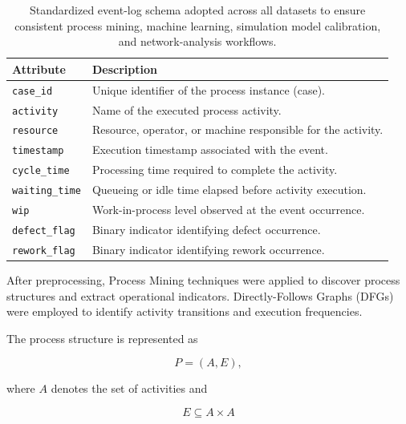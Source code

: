 \documentclass[pdflatex,iicol,Numbered,sn-basic]{sn-jnl}
\begin{document}
\begin{table}[t]
\caption{
Standardized event-log schema adopted across all datasets to ensure consistent process mining, machine learning, simulation model calibration, and network-analysis workflows.
}
\label{tab:event_schema}
\centering
\begin{tabularx}{\linewidth}{p{3cm}X}
\toprule
\textbf{Attribute} & \textbf{Description} \\
\midrule

\texttt{case\_id}
&
Unique identifier of the process instance (case).
\\

\texttt{activity}
&
Name of the executed process activity.
\\

\texttt{resource}
&
Resource, operator, or machine responsible for the activity.
\\

\texttt{timestamp}
&
Execution timestamp associated with the event.
\\

\texttt{cycle\_time}
&
Processing time required to complete the activity.
\\

\texttt{waiting\_time}
&
Queueing or idle time elapsed before activity execution.
\\

\texttt{wip}
&
Work-in-process level observed at the event occurrence.
\\

\texttt{defect\_flag}
&
Binary indicator identifying defect occurrence.
\\

\texttt{rework\_flag}
&
Binary indicator identifying rework occurrence.
\\

\bottomrule
\end{tabularx}
\end{table}

After preprocessing, Process Mining techniques were applied to discover process structures and extract operational indicators. Directly-Follows Graphs (DFGs) were employed to identify activity transitions and execution frequencies.

The process structure is represented as

\[
P=(A,E),
\]

where \(A\) denotes the set of activities and

\[
E \subseteq A \times A
\]
\end{document}
